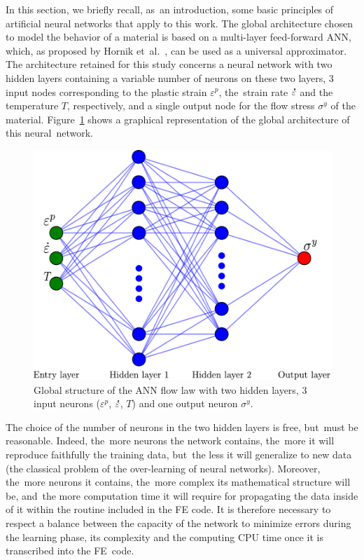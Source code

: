 \documentclass[algorithms,article,accept,pdftex,moreauthors]{Definitions/mdpi}
\DeclareRobustCommand{\mdot}[1]{\accentset{\mbox{\bfseries .}}{#1}}
\begin{document}
In this section, we briefly recall, as~an introduction, some basic principles of artificial neural networks that apply to this work.
The global architecture chosen to model the behavior of a material is based on a multi-layer feed-forward ANN, which, as proposed by Hornik et~al.~\cite{Hornik-1989}, can be used as a universal approximator.
The architecture retained for this study concerns a neural network with two hidden layers containing a variable number of neurons on these two layers, $3$ input nodes corresponding to the plastic strain $\varepsilon^p$, the~strain rate $\mdot\varepsilon$ and the temperature $T$, respectively, and a single output node for the flow stress $\sigma^y$ of the material.
Figure~\ref{fig:ANN-scheme} shows a graphical representation of the global architecture of this neural~network.
\begin{figure}[H]
\includegraphics[width=0.65\columnwidth]{Figures/ANN-scheme-2HL}
\caption{Global structure of the ANN flow law with two hidden layers, 3 input neurons ($\varepsilon^p$, $\mdot\varepsilon$, $T$) and one output neuron $\sigma^y$.}
\label{fig:ANN-scheme}
\end{figure}
The choice of the number of neurons in the two hidden layers is free, but~must be reasonable.
Indeed, the~more neurons the network contains, the~more it will reproduce faithfully the training data, but~the less it will generalize to new data (the classical problem of the over-learning of neural networks).
Moreover, the~more neurons it contains, the~more complex its mathematical structure will be, and~the more computation time it will require for propagating the data inside of it within the routine included in the FE code.
It is therefore necessary to respect a balance between the capacity of the network to minimize errors during the learning phase, its complexity and the computing CPU time once it is transcribed into the FE~code.
\end{document}
